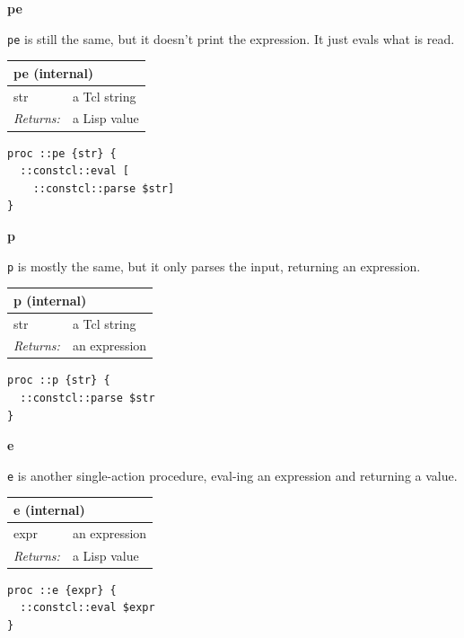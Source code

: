 \documentclass[twoside,9pt]{report}
\begin{document}
\textbf{pe}


\texttt{pe} is still the same, but it doesn't print the expression. It just evals what is read.

\begin{tabular}{ |l l| }
\hline
\multicolumn{2}{|l|}{pe (internal)} \\
\hline
str & a Tcl string \\
\textit{Returns:} & a Lisp value \\
\hline
\end{tabular}

\noindent\makebox[\linewidth]{\rule{\linewidth}{0.4pt}}
\begin{lstlisting}
proc ::pe {str} {
  ::constcl::eval [
    ::constcl::parse $str]
}
\end{lstlisting}
\noindent\makebox[\linewidth]{\rule{\linewidth}{0.4pt}}

\textbf{p}


\texttt{p} is mostly the same, but it only parses the input, returning an expression.

\begin{tabular}{ |l l| }
\hline
\multicolumn{2}{|l|}{p (internal)} \\
\hline
str & a Tcl string \\
\textit{Returns:} & an expression \\
\hline
\end{tabular}

\noindent\makebox[\linewidth]{\rule{\linewidth}{0.4pt}}
\begin{lstlisting}
proc ::p {str} {
  ::constcl::parse $str
}
\end{lstlisting}
\noindent\makebox[\linewidth]{\rule{\linewidth}{0.4pt}}

\textbf{e}


\texttt{e} is another single-action procedure, eval-ing an expression and returning a value.

\begin{tabular}{ |l l| }
\hline
\multicolumn{2}{|l|}{e (internal)} \\
\hline
expr & an expression \\
\textit{Returns:} & a Lisp value \\
\hline
\end{tabular}

\noindent\makebox[\linewidth]{\rule{\linewidth}{0.4pt}}
\begin{lstlisting}
proc ::e {expr} {
  ::constcl::eval $expr
}
\end{lstlisting}
\noindent\makebox[\linewidth]{\rule{\linewidth}{0.4pt}}
\end{document}
